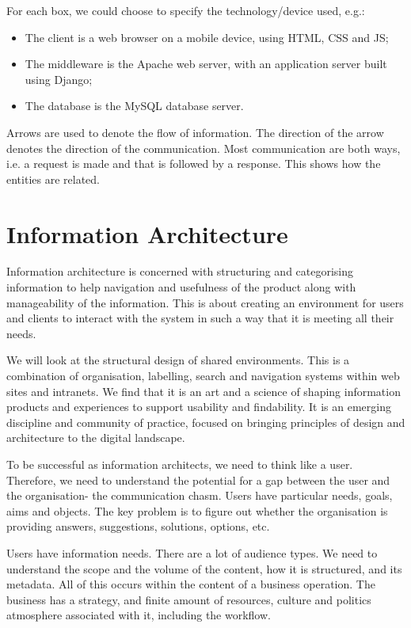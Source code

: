 \documentclass[a4paper, openany]{memoir}
\begin{document}
\noindent For each box, we could choose to specify the technology/device used, e.g.:
\begin{itemize}
    \item The client is a web browser on a mobile device, using HTML, CSS and JS;
    \item The middleware is the Apache web server, with an application server built using Django;
    \item The database is the MySQL database server.
\end{itemize}

\noindent Arrows are used to denote the flow of information. The direction of the arrow denotes the direction of the communication. Most communication are both ways, i.e. a request is made and that is followed by a response. This shows how the entities are related.
\newpage

\section{Information Architecture}
Information architecture is concerned with structuring and categorising information to help navigation and usefulness of the product along with manageability of the information. This is about creating an environment for users and clients to interact with the system in such a way that it is meeting all their needs.

\noindent We will look at the structural design of shared environments. This is a combination of organisation, labelling, search and navigation systems within web sites and intranets. We find that it is an art and a science of shaping information products and experiences to support usability and findability. It is an emerging discipline and community of practice, focused on bringing principles of design and architecture to the digital landscape.

\noindent To be successful as information  architects, we need to think like a user. Therefore, we need to understand the potential for a gap between the user and the organisation- the communication chasm. Users have particular needs, goals, aims and objects. The key problem is to figure out whether the organisation is providing answers, suggestions, solutions, options, etc.

\noindent Users have information needs. There are a lot of audience types. We need to understand the scope and the volume of the content, how it is structured, and its metadata. All of this occurs within the content of a business operation. The business has a strategy, and finite amount of resources, culture and politics atmosphere associated with it, including the workflow.
\end{document}
